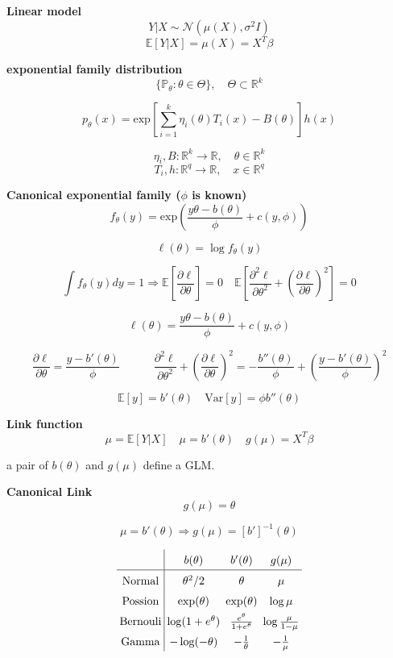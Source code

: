 \documentclass[12pt,a4paper]{article}
\begin{document}
\textbf{Linear model}
\[
	Y|X \sim \mathcal{N}(\mu(X),\sigma^2I)
\]
\[	
	\mathbb{E}[Y|X] = \mu(X) = X^T\beta
\]

\textbf{exponential family distribution}
\[
\{ \mathbb{P}_\theta : \theta \in \Theta \}, \quad \Theta \subset \mathbb{R}^k
\]

\[
	p_\theta(x) = \mathrm{exp}\left[\sum_{i=1}^{k} \eta_i(\theta)T_i(x) - B(\theta) \right]h(x)
\]

\[
\eta_i,B: \mathbb{R}^k \rightarrow \mathbb{R} ,\quad \theta \in \mathbb{R}^k
\]
\[
T_i,h: \mathbb{R}^q \rightarrow \mathbb{R}	,\quad x \in \mathbb{R}^q
\]

\textbf{Canonical exponential family ($\phi$ is known)}
\[
f_\theta(y) = \mathrm{exp}\left(\frac{y\theta-b(\theta)}{\phi} + c(y,\phi)\right)
\]

\[
	\ell(\theta) = \log f_\theta(y)
\]


\[
	\int f_\theta(y)dy = 1 \Rightarrow	
	\mathbb{E}\left[\frac{\partial\ell}{\partial\theta}\right] = 0 \quad \mathbb{E}\left[\frac{\partial^2\ell}{\partial\theta^2} + (\frac{\partial\ell}{\partial\theta})^2\right] = 0
\]

\[
	\ell(\theta) = \frac{y\theta-b(\theta)}{\phi} + c(y,\phi)
\]

\[
	\frac{\partial\ell}{\partial\theta} = \frac{y-b'(\theta)}{\phi} \quad\quad\quad
\frac{\partial^2\ell}{\partial\theta^2} + (\frac{\partial\ell}{\partial\theta})^2 = -\frac{b''(\theta)}{\phi} + \left(\frac{y-b'(\theta)}{\phi}\right)^2
\]

\[
\mathbb{E}[y] = b'(\theta) \quad \mathrm{Var}[y] = \phi b''(\theta)
\]

\textbf{Link function}
\[
	\mu = \mathbb{E}\left[ Y|X\right] \quad \mu = b'(\theta) \quad g(\mu) = X^T\beta
\]

a pair of $b(\theta)$ and $g(\mu)$ define a GLM.


\hspace{1cm}

\textbf{Canonical Link}
\[
	g(\mu) = \theta
\]

\[
	\mu = b'(\theta) \Rightarrow g(\mu) = [b']^{-1}(\theta)
\]

\[
\arraycolsep=2.5pt
\def\arraystretch{1.5}
\begin{array}{c|ccc}
 & b(\theta) & b'(\theta) & g(\mu) \\
 \hline
 \mbox{Normal} & \theta^2/2 & \theta & \mu \\
 \mbox{Possion} & \exp(\theta) & \exp(\theta) & \log\mu \\
 \mbox{Bernouli} & \log(1+e^\theta) & \frac{e^\theta}{1+e^\theta}& \log\frac{\mu}{1-\mu} \\
 \mbox{Gamma} & -\log(-\theta) & -\frac{1}{\theta} & - \frac{1}{\mu} \\
\end{array}
\]
\end{document}
